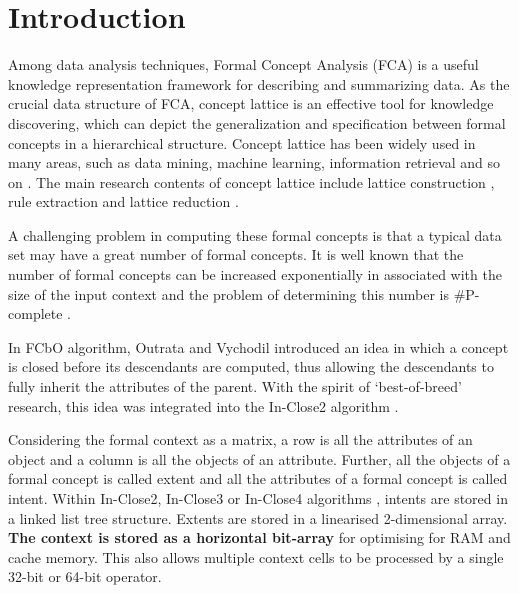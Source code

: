 \documentclass[11pt]{article}
\numberwithin{equation}{subsection}
\begin{document}
 \section{Introduction}

Among data analysis techniques, Formal Concept Analysis (FCA) is a useful knowledge representation framework for describing and summarizing data.
As the crucial data structure of FCA, concept lattice is an effective tool for  knowledge discovering, which can depict the generalization and specification between formal concepts in a hierarchical structure. Concept lattice  has been widely used in many areas, such as data mining, machine learning, information retrieval and so on \cite{BDF,Kuz,PIV,PBT, SYW,WW}. The main research contents of concept lattice include lattice construction  \cite{ Outrata,Andrews11, Andrews, Kuznetsov,  Osicka, QWL, QLW, QQW}, rule extraction \cite{LML,LMW,LMWZ,PRM} and lattice reduction  \cite{LMWZ, Kuznetsov2007,Ren}.

A challenging problem in computing these formal concepts is that a typical data set may have a great number of formal concepts.
 It is well known that the number of formal concepts can be increased exponentially in associated with the size of the input context and the problem of determining this number is \#P-complete \cite{ Kuznetsov01}.

In FCbO algorithm, Outrata and Vychodil \cite{ Outrata} introduced an idea in which a concept is closed before its descendants are computed, thus allowing the descendants to fully inherit the attributes of the parent. With the spirit of ‘best-of-breed’ research, this idea was integrated into the  In-Close2 algorithm  \cite{ Andrews11}.

Considering the formal context as a matrix, a row is all the attributes of an object and a column is all the objects of an attribute. Further, all the objects of a formal concept is called extent and all the attributes of a formal concept is called intent.
Within In-Close2, In-Close3 or In-Close4  algorithms \cite{ Andrews11,Andrews, Andrews17}, intents are stored in a linked list tree structure. Extents are stored in a linearised 2-dimensional  array. \textbf{The context is stored as a horizontal bit-array} for optimising for RAM and  cache memory.
This also allows multiple context cells to be processed by a single 32-bit or 64-bit operator.
\end{document}
